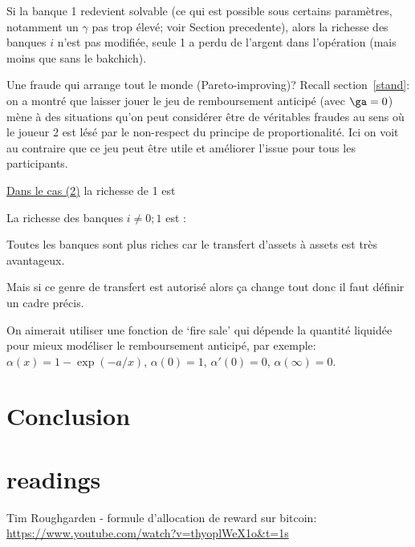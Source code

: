 \documentclass[11pt,oneside,twocolumn]{article}
\begin{document}
Si la banque 1 redevient solvable (ce qui est possible sous certains paramètres, notamment un $\gamma$ pas trop élevé; voir Section precedente), alors la richesse des banques $i$ n'est pas modifiée, seule 1 a perdu de l'argent dans l'opération (mais moins que sans le bakchich).

Une fraude qui arrange tout le monde (Pareto-improving)?
Recall section~\ref{stand}: on a montré que laisser jouer le jeu de remboursement anticipé (avec $\ga=0$)
mène à des situations qu'on peut considérer être de véritables fraudes au sens où le joueur 2 est lésé par le non-respect du principe de proportionalité. Ici on voit au contraire que ce jeu peut être utile et améliorer l'issue pour tous les participants.
\

\underline{Dans le cas (2)} la richesse de 1 est


La richesse des banques $i\neq 0; 1$ est : 


Toutes les banques sont plus riches car le transfert d'assets à assets est très avantageux.

Mais si ce genre de transfert est autorisé alors ça change tout donc il faut définir un cadre précis.

On aimerait utiliser une fonction de `fire sale' qui dépende la quantité liquidée pour mieux modéliser le remboursement anticipé, par exemple:
$\alpha(x) = 1 - \exp(-a/x)$, 
$\alpha(0)=1$, 
$\alpha'(0)=0$, 
$\alpha(\infty)=0$.


\section{Conclusion}
































\section{readings}

Tim Roughgarden - formule d'allocation de reward sur bitcoin: \url{https://www.youtube.com/watch?v=thyoplWeX1o&t=1s}
\end{document}
